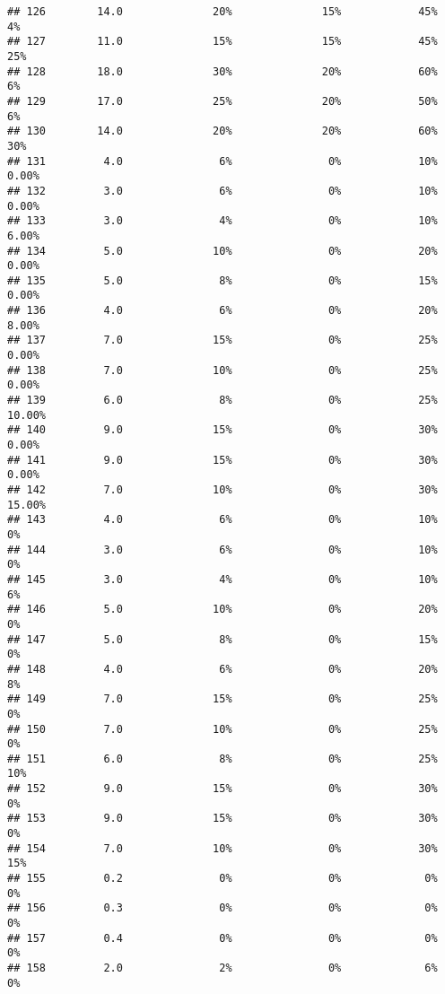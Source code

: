 \documentclass[
]{article}
\begin{document}
\begin{verbatim}
## 126        14.0              20%              15%            45%          4%
## 127        11.0              15%              15%            45%         25%
## 128        18.0              30%              20%            60%          6%
## 129        17.0              25%              20%            50%          6%
## 130        14.0              20%              20%            60%         30%
## 131         4.0               6%               0%            10%       0.00%
## 132         3.0               6%               0%            10%       0.00%
## 133         3.0               4%               0%            10%       6.00%
## 134         5.0              10%               0%            20%       0.00%
## 135         5.0               8%               0%            15%       0.00%
## 136         4.0               6%               0%            20%       8.00%
## 137         7.0              15%               0%            25%       0.00%
## 138         7.0              10%               0%            25%       0.00%
## 139         6.0               8%               0%            25%      10.00%
## 140         9.0              15%               0%            30%       0.00%
## 141         9.0              15%               0%            30%       0.00%
## 142         7.0              10%               0%            30%      15.00%
## 143         4.0               6%               0%            10%          0%
## 144         3.0               6%               0%            10%          0%
## 145         3.0               4%               0%            10%          6%
## 146         5.0              10%               0%            20%          0%
## 147         5.0               8%               0%            15%          0%
## 148         4.0               6%               0%            20%          8%
## 149         7.0              15%               0%            25%          0%
## 150         7.0              10%               0%            25%          0%
## 151         6.0               8%               0%            25%         10%
## 152         9.0              15%               0%            30%          0%
## 153         9.0              15%               0%            30%          0%
## 154         7.0              10%               0%            30%         15%
## 155         0.2               0%               0%             0%          0%
## 156         0.3               0%               0%             0%          0%
## 157         0.4               0%               0%             0%          0%
## 158         2.0               2%               0%             6%          0%

\end{verbatim}
\end{document}
